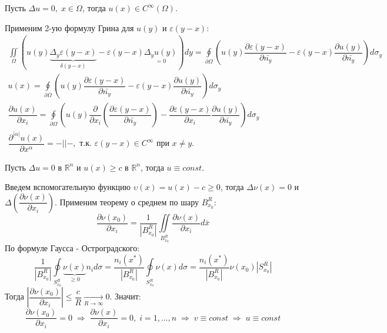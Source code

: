 \begin{theorem}
	$\;$\\
	Пусть $ \Delta u = 0, \; x \in \Omega$, тогда $u(x) \in C^{\infty}(\Omega)$.
\end{theorem}
\begin{Proof}
	Применим 2-ую формулу Грина для $ u(y) $ и $ \varepsilon(y - x)$:
	$$\begin{gathered}
		\iint \limits_{\Omega}(u(y)\underbrace{\Delta_y\varepsilon(y - x)}_{\delta(y - x)} - \varepsilon(y - x)\underset{= 0}{\Delta_y u(y)})dy = \oint\limits_{\partial \Omega} (u(y) \dfrac{\partial \varepsilon(y - x)}{\partial \bar{n_y}} - \varepsilon(y - x) \dfrac{\partial u(y)}{\partial \bar{n_y}})d\sigma_y \\
		u(x) = \oint\limits_{\partial \Omega}\left( u(y) \dfrac{\partial \varepsilon(y - x)}{\partial \bar{n_y}} - \varepsilon(y - x) \dfrac{\partial u(y)}{\partial \bar{n_y}}\right)d\sigma_y\\
		\dfrac{\partial u(x)}{\partial x_i} =  \oint\limits_{\partial \Omega}\left( u(y) \dfrac{\partial}{\partial x_i}(\dfrac{\partial \varepsilon(y - x)}{\partial \bar{n_y}}) - \dfrac{\partial \varepsilon(y - x)}{\partial x_i} \dfrac{\partial u(y)}{\partial \bar{n_y}}\right)d\sigma_y \\
		\dfrac{\partial^{|\alpha|} u(x)}{\partial x^{\alpha}} = - || -, \text{ т.к. } \varepsilon(y - x) \in C^{\infty} \text{ при } x \neq y.
	\end{gathered}$$
\end{Proof}

\begin{theorem}
	$\;$\\
	Пусть $ \Delta u = 0 \text{ в } \mathbb{R}^n$ и $u(x) \geq c \text{ в } \mathbb{R}^n$, тогда $u \equiv const$.
\end{theorem}
\begin{Proof}
	Введем вспомогательную функцию $ \upsilon(x) = u(x) - c \geq 0$, тогда $\Delta \nu(x) = 0$ и $\Delta(\dfrac{\partial \nu(x)}{\partial x_i})$. Применим теорему о среднем по шару $ B_{x_0}^R $:
	$$\dfrac{\partial \nu(x_0)}{\partial x_i} = \dfrac{1}{|B_{x_0}^R|} \iint\limits_{B_{x_0}^R} \dfrac{\partial \nu(x)}{\partial x_i} d\bar{x}$$
	По формуле Гаусса - Остроградского:
	$$\dfrac{1}{|B_{x_0}^R|} \oint\limits_{S_{x_0}^R} \underbrace{\nu(x)}_{\geq 0}n_id\sigma = \dfrac{n_i(x^*)}{|B_{x_0}^R|} \oint\limits_{S_{x_0}^R} \nu(x)d\sigma = \dfrac{n_i(x^*)}{|B_{x_0}^R|}\nu(x_0)  |S_{x_0}^R|$$
	Тогда $\displaystyle |\dfrac{\partial \nu(x_0)}{\partial x_i}| \leq \dfrac{c}{R} \underset{R \longrightarrow \infty}{\longrightarrow} 0$. Значит:
	$$\dfrac{\partial \nu(x_0)}{\partial x_i} = 0 \; \Rightarrow \;  \dfrac{\partial \nu(x)}{\partial x_i} = 0, \; i = 1, \ldots, n \; \Rightarrow \;  v \equiv const \; \Rightarrow \;  u \equiv const$$
\end{Proof}









